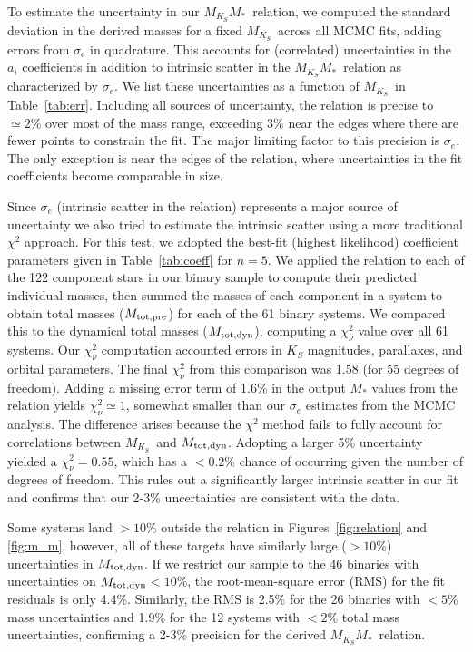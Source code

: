 \documentclass[twocolumn]{aastex62}
\newcommand{\mks}{$M_{K_S}$}
\newcommand{\mmk}{$M_{K_S}$\textendash$M_*$}
\newcommand{\order}{5}
\newcommand{\mpred}{$M_{\rm{tot,pre}}$}
\newcommand{\mdyn}{$M_{\rm{tot,dyn}}$}
\begin{document}
To estimate the uncertainty in our \mmk\ relation, we computed the standard deviation in the derived masses for a fixed \mks\ across all MCMC fits, adding errors from $\sigma_e$ in quadrature. This accounts for (correlated) uncertainties in the $a_i$ coefficients in addition to intrinsic scatter in the \mmk\ relation as characterized by $\sigma_e$. We list these uncertainties as a function of \mks\ in Table~\ref{tab:err}. Including all sources of uncertainty, the relation is precise to $\simeq2\%$ over most of the mass range, exceeding $3\%$ near the edges where there are fewer points to constrain the fit. The major limiting factor to this precision is $\sigma_e$. The only exception is near the edges of the relation, where uncertainties in the fit coefficients become comparable in size. 

Since $\sigma_e$ (intrinsic scatter in the relation) represents a major source of uncertainty we also tried to estimate the intrinsic scatter using a more traditional $\chi^2$ approach. For this test, we adopted the best-fit (highest likelihood) coefficient parameters given in Table~\ref{tab:coeff} for $n=\order$. We applied the relation to each of the 122 component stars in our binary sample to compute their predicted individual masses, then summed the masses of each component in a system to obtain total masses (\mpred) for each of the 61 binary systems. We compared this to the dynamical total masses (\mdyn), computing a $\chi^2_\nu$ value over all 61 systems. Our $\chi^2_\nu$ computation accounted errors in $K_S$ magnitudes, parallaxes, and orbital parameters. The final $\chi^2_\nu$ from this comparison was 1.58 (for 55 degrees of freedom). Adding a missing error term of 1.6\% in the output $M_*$ values from the relation yields $\chi^2_\nu \simeq 1$, somewhat smaller than our $\sigma_e$ estimates from the MCMC analysis. The difference arises because the $\chi^2$ method fails to fully account for correlations between \mks\ and \mdyn. Adopting a larger 5\% uncertainty yielded a $\chi^2_\nu=0.55$, which has a $<0.2\%$ chance of occurring given the number of degrees of freedom. This rules out a significantly larger intrinsic scatter in our fit and confirms that our 2-3\% uncertainties are consistent with the data. 

Some systems land $>10\%$ outside the relation in Figures~\ref{fig:relation} and \ref{fig:m_m}, however, all of these targets have similarly large ($>10\%$) uncertainties in \mdyn. If we restrict our sample to the 46 binaries with uncertainties on \mdyn$<10\%$, the root-mean-square error (RMS) for the fit residuals is only 4.4\%. Similarly, the RMS is 2.5\% for the 26 binaries with $<5\%$ mass uncertainties and 1.9\% for the 12 systems with $<2\%$ total mass uncertainties, confirming a 2-3\% precision for the derived \mmk\ relation. 
\end{document}
